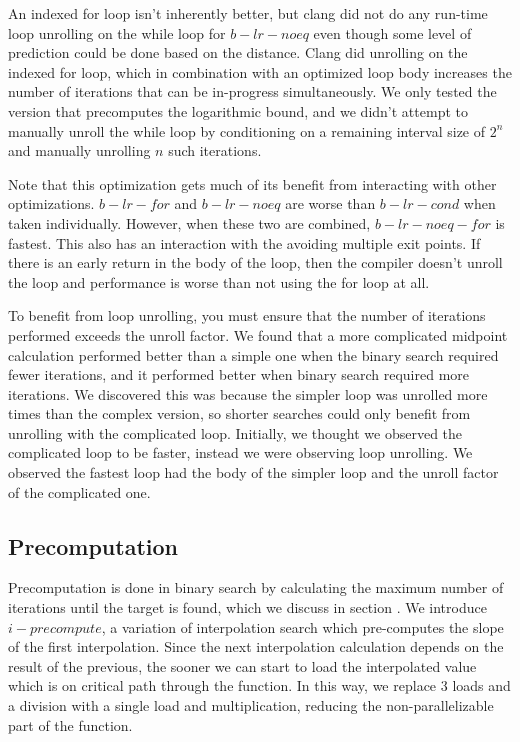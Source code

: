 \documentclass[twocolumn]{article}
\begin{document}
An indexed for loop isn't inherently better, but clang did not do any run-time loop unrolling on the while loop for $b-lr-noeq$ even though some level of prediction could be done based on the distance. Clang did unrolling on the indexed for loop, which in combination with an optimized loop body increases the number of iterations that can be in-progress simultaneously. We only tested the version that precomputes the logarithmic bound, and we didn't attempt to manually unroll the while loop by conditioning on a remaining interval size of $2^n$ and manually unrolling $n$ such iterations.

Note that this optimization gets much of its benefit from interacting with other optimizations. $b-lr-for$ and $b-lr-noeq$ are worse than $b-lr-cond$ when taken individually. However, when these two are combined, $b-lr-noeq-for$ is fastest. This also has an interaction with the avoiding multiple exit points. If there is an early return in the body of the loop, then the compiler doesn't unroll the loop and performance is worse than not using the for loop at all.

To benefit from loop unrolling, you must ensure that the number of iterations performed exceeds the unroll factor. We found that a more complicated midpoint calculation performed better than a simple one when the binary search required fewer iterations, and it performed better when binary search required more iterations. We discovered this was because the simpler loop was unrolled more times than the complex version, so shorter searches could only benefit from unrolling with the complicated loop. Initially, we thought we observed the complicated loop to be faster, instead we were observing loop unrolling. We observed the fastest loop had the body of the simpler loop and the unroll factor of the complicated one.


\subsection{Precomputation}
\label{precomputation}
Precomputation is done in binary search by calculating the maximum number of iterations until the target is found, which we discuss in section \label{for}. We introduce $i-precompute$, a variation of interpolation search which pre-computes the slope of the first interpolation. Since the next interpolation calculation depends on the result of the previous, the sooner we can start to load the interpolated value which is on critical path through the function. In this way, we replace 3 loads and a division with a single load and multiplication, reducing the non-parallelizable part of the function.
\end{document}
